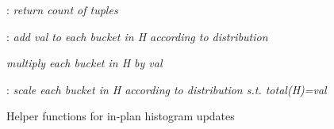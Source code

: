   \begin{algorithmic}
    
     : 
     	\State \textit{return count of tuples}
     \EndFunction
    
        :
        \State \textit{add val to each bucket in H according to distribution}
    \EndFunction
    

    	\State \textit{multiply each bucket in H by val}
    \EndFunction
    
        :
        \State \textit{scale each bucket in H according to distribution s.t. total(H)=val}
    \EndFunction
    
    
  \end{algorithmic}
  \caption{Helper functions for in-plan histogram updates}
  \label{algo:histogram-transformation-helpers}
